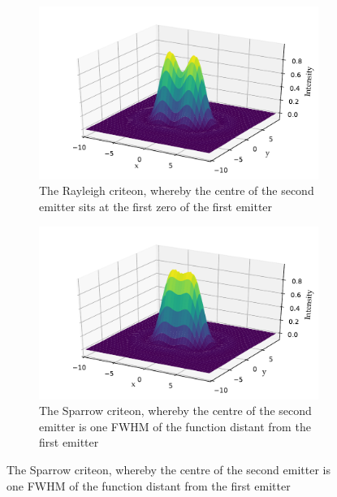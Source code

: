 \begin{figure}
    \centering
    \begin{subfigure}[b]{\textwidth}
        \centering
        \includegraphics{+airy_rayleigh}
        \caption{The Rayleigh criteon, whereby the centre of the second emitter sits at the first zero of the first emitter}\label{fig:airy_rayleigh}
    \end{subfigure}
    \begin{subfigure}[b]{\textwidth}
        \includegraphics{+airy_sparrow}
        \caption{The Sparrow criteon, whereby the centre of the second emitter is one \gls{FWHM} of the function distant from the first emitter}
        \label{fig:airy_sparrow}
    \end{subfigure}
    \end{figure}
